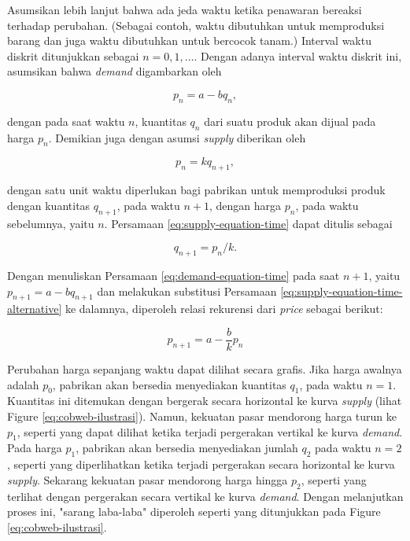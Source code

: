 \documentclass{article}
\theoremstyle{plain}
\begin{document}
Asumsikan lebih lanjut bahwa ada jeda waktu ketika penawaran bereaksi terhadap perubahan. (Sebagai contoh, waktu dibutuhkan untuk memproduksi barang dan juga waktu dibutuhkan untuk bercocok tanam.) Interval waktu diskrit ditunjukkan sebagai $n = 0,1, \ldots$. Dengan adanya interval waktu diskrit ini, asumsikan bahwa \textit{demand} digambarkan oleh 

\begin{equation}
	p_n = a - bq_n,
	\label{eq:demand-equation-time}
\end{equation}

\noindent dengan pada saat waktu $n$, kuantitas $q_n$ dari suatu produk akan dijual pada harga $p_n$. Demikian juga dengan asumsi \textit{supply} diberikan oleh

\begin{equation}
	p_n = kq_{n+1},
	\label{eq:supply-equation-time}
\end{equation}

\noindent dengan satu unit waktu diperlukan bagi pabrikan untuk memproduksi produk dengan kuantitas $q_{n+1}$, pada waktu $n + 1$, dengan harga $p_n$, pada waktu sebelumnya, yaitu $n$. Persamaan \eqref{eq:supply-equation-time} dapat ditulis sebagai 

\begin{equation}
	q_{n+1} = p_n / k.
	\label{eq:supply-equation-time-alternative}
\end{equation}

Dengan menuliskan Persamaan \eqref{eq:demand-equation-time} pada saat $n+1$, yaitu $p_{n+1} = a - b q_{n+1}$ dan melakukan substitusi Persamaan \eqref{eq:supply-equation-time-alternative} ke dalamnya, diperoleh relasi rekurensi dari \textit{price} sebagai berikut:

\begin{equation}
	p_{n+1} = a - \frac{b}{k} p_n
	\label{eq:price-recursive-relation}
\end{equation}

Perubahan harga sepanjang waktu dapat dilihat secara grafis. Jika harga awalnya adalah $p_0$, pabrikan akan bersedia menyediakan kuantitas $q_1$, pada waktu $n = 1$. Kuantitas ini ditemukan dengan bergerak secara horizontal ke kurva \textit{supply} (lihat Figure \eqref{eq:cobweb-ilustrasi}). Namun, kekuatan pasar mendorong harga turun ke $p_1$, seperti yang dapat dilihat ketika terjadi pergerakan vertikal ke kurva \textit{demand}. Pada harga $p_1$, pabrikan akan bersedia menyediakan jumlah $q_2$ pada waktu $n = 2$, seperti yang diperlihatkan ketika terjadi pergerakan secara horizontal ke kurva \textit{supply}. Sekarang kekuatan pasar mendorong harga hingga $p_2$, seperti yang terlihat dengan pergerakan secara vertikal ke kurva \textit{demand}.
Dengan melanjutkan proses ini, "sarang laba-laba" diperoleh seperti yang ditunjukkan pada Figure \eqref{eq:cobweb-ilustrasi}.
\end{document}
